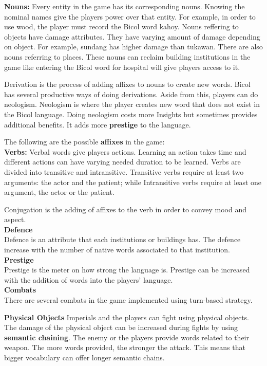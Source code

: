 \documentclass[11pt]{article}
\begin{document}
\textbf{Nouns:}
Every entity in the game has its corresponding nouns. Knowing the nominal names give the players power over that entity. For example, in order to use wood, the player must record the Bicol word kahoy. Nouns reffering to objects have damage attributes. They have varying amount of damage depending on object. For example, sundang has higher damage than tukawan.
There are also nouns referring to places. These nouns can reclaim building institutions in the game like entering the Bicol word for hospital will give players access to it.

Derivation is the process of adding affixes to nouns to create new words. Bicol has several productive ways of doing derivations. Aside from this, players can do neologism. Neologism is where the player creates new word that does not exist in the Bicol language. Doing neologism costs more Insights but sometimes provides additional benefits. It adds more \textbf{prestige} to the language.

The following are the possible \textbf{affixes} in the game:\\


\textbf{Verbs:}
Verbal words give players actions. Learning an action takes time and different actions can have varying needed duration to be learned. Verbs are divided into transitive and intransitive. Transitive verbs require at least two arguments: the actor and the patient; while Intransitive verbs require at least one argument, the actor or the patient.

Conjugation is the adding of affixes to the verb in order to convey mood and aspect.\\

\textbf{Defence}\\
Defence is an attribute that each institutions or buildings has. The defence increase with the number of native words associated to that institution.\\

\textbf{Prestige}\\
Prestige is the meter on how strong the language is. Prestige can be increased with the addition of words into the players' language.\\

\textbf{Combats}\\
There are several combats in the game implemented using turn-based strategy.

\textbf{Physical Objects}
Imperials and the players can fight using physical objects. The damage of the physical object can be increased during fights by using \textbf{semantic chaining}. The enemy or the players provide words related to their weapon. The more words provided, the stronger the attack. This means that bigger vocabulary can offer longer semantic chains.
\end{document}
